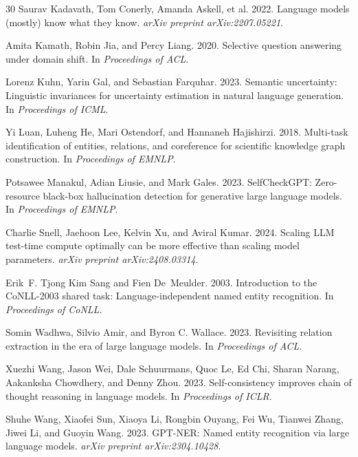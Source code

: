 \documentclass[11pt,a4paper]{article}
\begin{document}
\begin{thebibliography}{30}
Saurav Kadavath, Tom Conerly, Amanda Askell, et al. 2022.
\newblock Language models (mostly) know what they know.
\newblock \emph{arXiv preprint arXiv:2207.05221}.

Amita Kamath, Robin Jia, and Percy Liang. 2020.
\newblock Selective question answering under domain shift.
\newblock In \emph{Proceedings of ACL}.

Lorenz Kuhn, Yarin Gal, and Sebastian Farquhar. 2023.
\newblock Semantic uncertainty: Linguistic invariances for uncertainty estimation in natural language generation.
\newblock In \emph{Proceedings of ICML}.

Yi Luan, Luheng He, Mari Ostendorf, and Hannaneh Hajishirzi. 2018.
\newblock Multi-task identification of entities, relations, and coreference for scientific knowledge graph construction.
\newblock In \emph{Proceedings of EMNLP}.

Potsawee Manakul, Adian Liusie, and Mark Gales. 2023.
\newblock SelfCheckGPT: Zero-resource black-box hallucination detection for generative large language models.
\newblock In \emph{Proceedings of EMNLP}.

Charlie Snell, Jaehoon Lee, Kelvin Xu, and Aviral Kumar. 2024.
\newblock Scaling LLM test-time compute optimally can be more effective than scaling model parameters.
\newblock \emph{arXiv preprint arXiv:2408.03314}.

Erik~F. Tjong Kim Sang and Fien De~Meulder. 2003.
\newblock Introduction to the CoNLL-2003 shared task: Language-independent named entity recognition.
\newblock In \emph{Proceedings of CoNLL}.

Somin Wadhwa, Silvio Amir, and Byron C. Wallace. 2023.
\newblock Revisiting relation extraction in the era of large language models.
\newblock In \emph{Proceedings of ACL}.

Xuezhi Wang, Jason Wei, Dale Schuurmans, Quoc Le, Ed Chi, Sharan Narang, Aakanksha Chowdhery, and Denny Zhou. 2023.
\newblock Self-consistency improves chain of thought reasoning in language models.
\newblock In \emph{Proceedings of ICLR}.

Shuhe Wang, Xiaofei Sun, Xiaoya Li, Rongbin Ouyang, Fei Wu, Tianwei Zhang, Jiwei Li, and Guoyin Wang. 2023.
\newblock GPT-NER: Named entity recognition via large language models.
\newblock \emph{arXiv preprint arXiv:2304.10428}.

\end{thebibliography}
\end{document}
